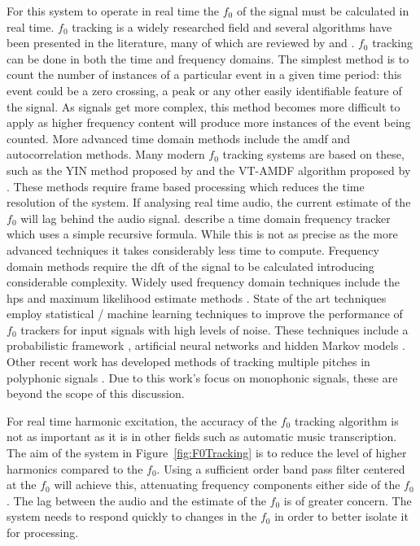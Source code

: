 		For this system to operate in real time the $f_{0}$ of the signal must be calculated in real time.  $f_{0}$
		tracking is a widely researched field and several algorithms have been presented in the literature, many of
		which are reviewed by \citet{cuadra2001efficient} and \citet{gerhard2003pitch}.  $f_{0}$ tracking can be
		done in both the time and frequency domains. The simplest method is to count the number of instances of a
		particular event in a given time period: this event could be a zero crossing, a peak or any other easily
		identifiable feature of the signal. As signals get more complex, this method becomes more difficult to
		apply as higher frequency content will produce more instances of the event being counted. More advanced
		time domain methods include the \acrfull{amdf} and autocorrelation methods.  Many modern $f_{0}$ tracking
		systems are based on these, such as the YIN method proposed by \citet{decheveigne2002yin} and the VT-AMDF
		algorithm proposed by \citet{prukkanon2009vt-amdf}.  These methods require frame based processing which
		reduces the time resolution of the system. If analysing real time audio, the current estimate of the
		$f_{0}$ will lag behind the audio signal. \citet{larsen2004audio} describe a time domain frequency tracker
		which uses a simple recursive formula. While this is not as precise as the more advanced techniques it
		takes considerably less time to compute. Frequency domain methods require the \acrshort{dft} of the signal
		to be calculated introducing considerable complexity.  Widely used frequency domain techniques include the
		\acrfull{hps} and maximum likelihood estimate methods \citep{noll1969pitch}. State of the art techniques
		employ statistical / machine learning techniques to improve the performance of $f_{0}$ trackers for input
		signals with high levels of noise.  These techniques include a probabilistic framework \citep{chu2012safe},
		artificial neural networks \citep{han2014neural} and hidden Markov models \citep{wang2016f0}. Other recent
		work has developed methods of tracking multiple pitches in polyphonic signals \citep{christensen2008multi}.
		Due to this work's focus on monophonic signals, these are beyond the scope of this discussion.

		For real time harmonic excitation, the accuracy of the $f_{0}$ tracking algorithm is not as important as it
		is in other fields such as automatic music transcription. The aim of the system in
		Figure~\ref{fig:F0Tracking} is to reduce the level of higher harmonics compared to the $f_{0}$. Using a
		sufficient order band pass filter centered at the $f_{0}$ will achieve this, attenuating frequency
		components either side of the $f_{0}$. The lag between the audio and the estimate of the $f_{0}$ is of
		greater concern. The system needs to respond quickly to changes in the $f_{0}$ in order to better isolate
		it for processing.

